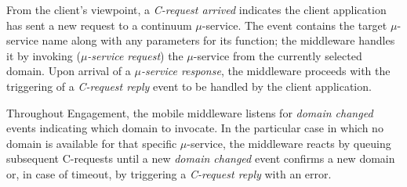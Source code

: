 
%
%		
%		
%		

From the client's viewpoint, a \textit{C-request arrived} indicates the client application has sent a new request to a continuum $\mu$-service. The event contains the target $\mu$-service name along with any parameters for its function; the middleware handles it by invoking (\textit{$\mu$-service request}) the $\mu$-service from the currently selected domain. Upon arrival of a \textit{$\mu$-service response}, the middleware proceeds with the triggering of a \textit{C-request reply} event to be handled by the client application.  

Throughout Engagement, the mobile middleware listens for \textit{domain changed} events indicating which domain to invocate. In the particular case in which no domain is available for that specific $\mu$-service,
the middleware reacts by queuing subsequent C-requests until a new \textit{domain changed} event confirms a new domain or, in case of timeout, by triggering a \textit{C-request reply} with an error. 


